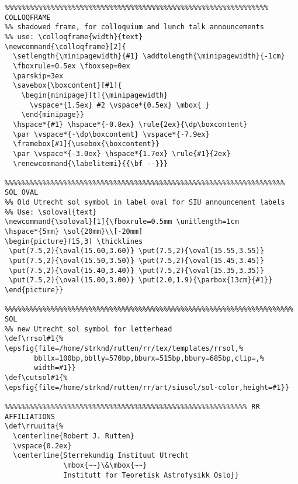 {\begin{verbatim}
%%%%%%%%%%%%%%%%%%%%%%%%%%%%%%%%%%%%%%%%%%%%%%%%%%%%%%%%%%%%%%% COLLOQFRAME
%% shadowed frame, for colloquium and lunch talk announcements
%% use: \colloqframe{width}{text}
\newcommand{\colloqframe}[2]{
  \setlength{\minipagewidth}{#1} \addtolength{\minipagewidth}{-1cm}
  \fboxrule=0.5ex \fboxsep=0ex
  \parskip=3ex
  \savebox{\boxcontent}[#1]{
    \begin{minipage}[t]{\minipagewidth}
      \vspace*{1.5ex} #2 \vspace*{0.5ex} \mbox{ }
    \end{minipage}}
  \hspace*{#1} \hspace*{-0.8ex} \rule{2ex}{\dp\boxcontent}
  \par \vspace*{-\dp\boxcontent} \vspace*{-7.9ex}
  \framebox[#1]{\usebox{\boxcontent}}
  \par \vspace*{-3.0ex} \hspace*{1.7ex} \rule{#1}{2ex}
  \renewcommand{\labelitemi}{{\bf --}}}

%%%%%%%%%%%%%%%%%%%%%%%%%%%%%%%%%%%%%%%%%%%%%%%%%%%%%%%%%%%%%%%%%%% SOL OVAL
%% Old Utrecht sol symbol in label oval for SIU announcement labels 
%% Use: \soloval{text}
\newcommand{\soloval}[1]{\fboxrule=0.5mm \unitlength=1cm
\hspace*{5mm} \sol{20mm}\\[-20mm]
\begin{picture}(15,3) \thicklines
 \put(7.5,2){\oval(15.60,3.60)} \put(7.5,2){\oval(15.55,3.55)}
 \put(7.5,2){\oval(15.50,3.50)} \put(7.5,2){\oval(15.45,3.45)}
 \put(7.5,2){\oval(15.40,3.40)} \put(7.5,2){\oval(15.35,3.35)}
 \put(7.5,2){\oval(15.00,3.00)} \put(2.0,1.9){\parbox{13cm}{#1}}
\end{picture}}

%%%%%%%%%%%%%%%%%%%%%%%%%%%%%%%%%%%%%%%%%%%%%%%%%%%%%%%%%%%%%%%%%%%%% SOL
%% new Utrecht sol symbol for letterhead
\def\rrsol#1{%
\epsfig{file=/home/strknd/rutten/rr/tex/templates/rrsol,%
       bbllx=100bp,bblly=570bp,bburx=515bp,bbury=685bp,clip=,%
       width=#1}}
\def\cutsol#1{%
\epsfig{file=/home/strknd/rutten/rr/art/siusol/sol-color,height=#1}}

%%%%%%%%%%%%%%%%%%%%%%%%%%%%%%%%%%%%%%%%%%%%%%%%%%%%%%%%%% RR AFFILIATIONS
\def\rruuita{%
  \centerline{Robert J. Rutten}
  \vspace{0.2ex}
  \centerline{Sterrekundig Instituut Utrecht 
              \mbox{~~}\&\mbox{~~}
              Institutt for Teoretisk Astrofysikk Oslo}}


\end{verbatim}}
